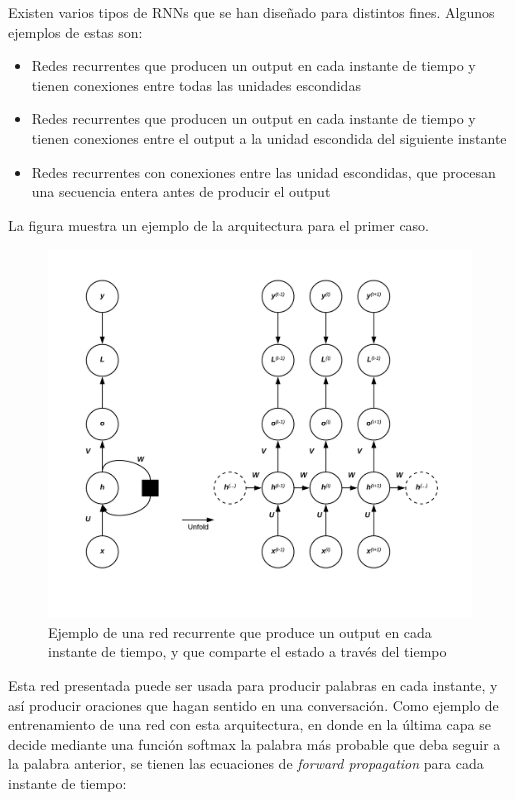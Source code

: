 Existen varios tipos de RNNs que se han dise{\~{n}}ado para distintos fines. Algunos ejemplos de estas son:

\begin{itemize}
  \item Redes recurrentes que producen un output en cada instante de tiempo y tienen conexiones entre todas las unidades escondidas
  \item Redes recurrentes que producen un output en cada instante de tiempo y tienen conexiones entre el output a la unidad escondida del siguiente instante
  \item Redes recurrentes con conexiones entre las unidad escondidas, que procesan una secuencia entera antes de producir el output
\end{itemize}

La figura muestra un ejemplo de la arquitectura para el primer caso.

\begin{figure}[H]
\captionsetup{font=small,labelfont=small}
\caption{Ejemplo de una red recurrente que produce un output en cada instante de tiempo, y que comparte el estado a trav\'es del tiempo}
\centering
\includegraphics[scale=.5]{img/RNN2.png}
\end{figure}

Esta red presentada puede ser usada para producir palabras en cada instante, y as\'i producir oraciones que hagan sentido en una conversaci\'on. Como ejemplo de entrenamiento de una red con esta arquitectura, en donde en la \'ultima capa se decide mediante una funci\'on softmax la palabra m\'as probable que deba seguir a la palabra anterior, se tienen las ecuaciones de \textit{forward propagation} para cada instante de tiempo:

